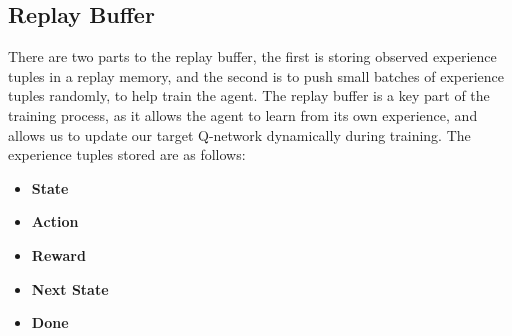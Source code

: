 \subsection{Replay Buffer} %
There are two parts to the replay buffer, the first is storing observed experience tuples in a replay 
memory, and the second is to push small batches of experience tuples randomly, to help train the agent. 
The replay buffer is a key part of the training process, as it allows the agent to learn from its own 
experience, and allows us to update our target Q-network dynamically during training. The experience
tuples stored are as follows: 
\begin{itemize}
    \item \textbf{State}
    \item \textbf{Action}
    \item \textbf{Reward}
    \item \textbf{Next State}
    \item \textbf{Done}
\end{itemize}



